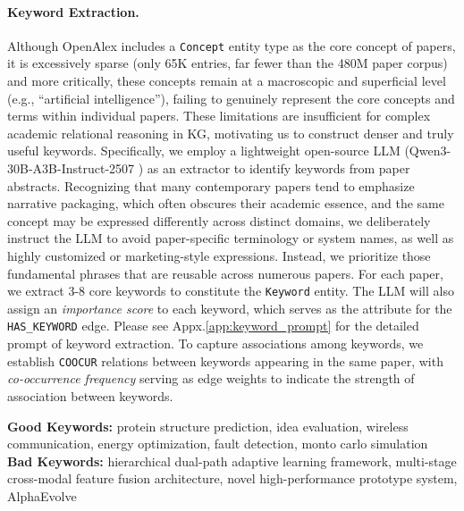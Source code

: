 \documentclass{llmxive}
\begin{document}
\paragraph{Keyword Extraction.}
Although OpenAlex includes a \texttt{Concept} entity type as the core concept of papers, it is excessively sparse (only 65K entries, far fewer than the 480M paper corpus) and more critically, these concepts remain at a macroscopic and superficial level (e.g., ``artificial intelligence''), failing to genuinely represent the core concepts and terms within individual papers.
These limitations are insufficient for complex academic relational reasoning in KG, motivating us to construct denser and truly useful keywords.
Specifically, we employ a lightweight open-source LLM (Qwen3-30B-A3B-Instruct-2507 \citep{qwen3}) as an extractor to identify keywords from paper abstracts.
Recognizing that many contemporary papers tend to emphasize narrative packaging, which often obscures their academic essence, and the same concept may be expressed differently across distinct domains, we deliberately instruct the LLM to avoid paper-specific terminology or system names, as well as highly customized or marketing-style expressions.
Instead, we prioritize those fundamental phrases that are reusable across numerous papers.
For each paper, we extract 3-8 core keywords to constitute the \texttt{Keyword} entity.
The LLM will also assign an \textit{importance score} to each keyword, which serves as the attribute for the \texttt{HAS\_KEYWORD} edge.
Please see Appx.\ref{app:keyword_prompt} for the detailed prompt of keyword extraction.
To capture associations among keywords, we establish \texttt{COOCUR} relations between keywords appearing in the same paper, with \textit{co-occurrence frequency} serving as edge weights to indicate the strength of association between keywords.

\begin{tcolorbox}[breakable,colback=persona!20!white, colframe=persona!60!black, title=\textbf{Examples of Good and Bad Keywords}]
    \label{good_bad_keywords}
    \textbf{Good Keywords:} protein structure prediction, idea evaluation, wireless communication, energy optimization, fault detection, monto carlo simulation\\
    
    \textbf{Bad Keywords:} hierarchical dual-path adaptive learning framework, multi-stage cross-modal feature fusion architecture, novel high-performance prototype system, AlphaEvolve
\end{tcolorbox}
\end{document}
